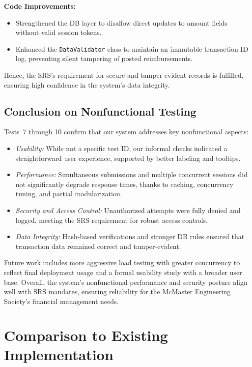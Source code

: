 \documentclass[12pt, titlepage]{article}
\begin{document}
\noindent
\textbf{Code Improvements:}  
\begin{itemize}
  \item Strengthened the DB layer to disallow direct updates to amount fields without valid session tokens.
  \item Enhanced the \texttt{DataValidator} class to maintain an immutable transaction ID log, preventing silent tampering of posted reimbursements.
\end{itemize}
Hence, the SRS’s requirement for secure and tamper-evident records is fulfilled, ensuring high confidence in the system’s data integrity.

\subsection{Conclusion on Nonfunctional Testing}

Tests~7 through 10 confirm that our system addresses key nonfunctional aspects: 
\begin{itemize}
  \item \emph{Usability:} While not a specific test ID, our informal checks indicated a straightforward user experience, supported by better labeling and tooltips.
  \item \emph{Performance:} Simultaneous submissions and multiple concurrent sessions did not significantly degrade response times, thanks to caching, concurrency tuning, and partial modularization.
  \item \emph{Security and Access Control:} Unauthorized attempts were fully denied and logged, meeting the SRS requirement for robust access controls.
  \item \emph{Data Integrity:} Hash-based verifications and stronger DB rules ensured that transaction data remained correct and tamper-evident.
\end{itemize}

Future work includes more aggressive load testing with greater concurrency to reflect final deployment usage and a formal usability study with a broader user base. Overall, the system’s nonfunctional performance and security posture align well with SRS mandates, ensuring reliability for the McMaster Engineering Society’s financial management needs.

	
\section{Comparison to Existing Implementation}	
\end{document}
